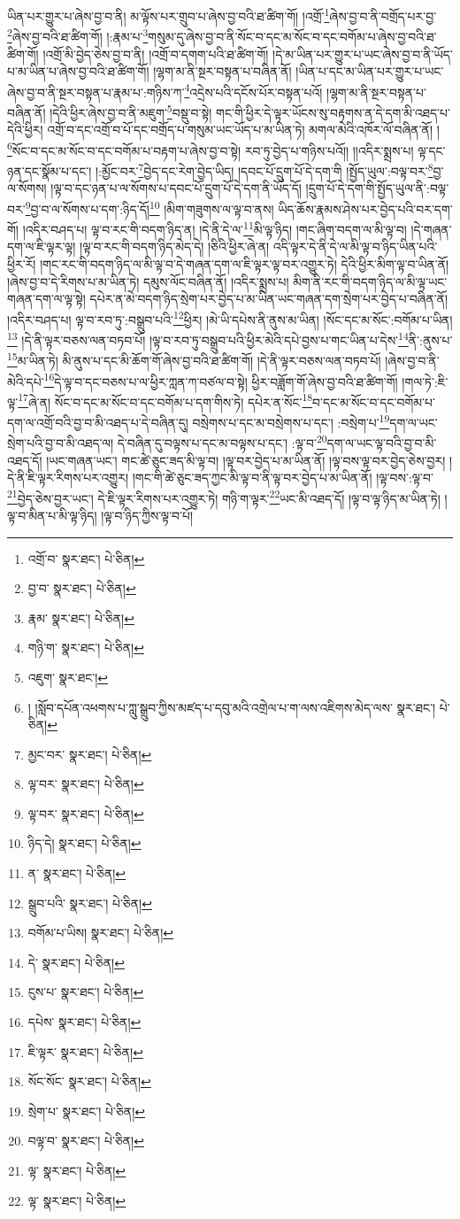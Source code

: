 ཡིན་པར་གྱུར་པ་ཞེས་བྱ་བ་ནི། མ་ལྟོས་པར་གྲུབ་པ་ཞེས་བྱ་བའི་ཐ་ཚིག་གོ། །འགྲོ་\footnote{འགྲོ་བ་  སྣར་ཐང་།  པེ་ཅིན། }ཞེས་བྱ་བ་ནི་བགྲོད་པར་བྱ་\footnote{བྱ་བ་  སྣར་ཐང་།  པེ་ཅིན། }ཞེས་བྱ་བའི་ཐ་ཚིག་གོ། །:རྣམ་པ་\footnote{རྣམ་  སྣར་ཐང་།  པེ་ཅིན། }གསུམ་དུ་ཞེས་བྱ་བ་ནི་སོང་བ་དང་མ་སོང་བ་དང་བགོམ་པ་ཞེས་བྱ་བའི་ཐ་ཚིག་གོ། །འགྲོ་མི་བྱེད་ཅེས་བྱ་བ་ནི། །འགྲོ་བ་དགག་པའི་ཐ་ཚིག་གོ། །དེ་མ་ཡིན་པར་གྱུར་པ་ཡང་ཞེས་བྱ་བ་ནི་ཡོད་པ་མ་ཡིན་པ་ཞེས་བྱ་བའི་ཐ་ཚིག་གོ། །ལྷག་མ་ནི་སྔར་བསྟན་པ་བཞིན་ནོ། །ཡིན་པ་དང་མ་ཡིན་པར་གྱུར་པ་ཡང་ཞེས་བྱ་བ་ནི་སྔར་བསྟན་པ་རྣམ་པ་:གཉིས་ཀ་\footnote{གཉི་ག་  སྣར་ཐང་།  པེ་ཅིན། }འདྲེས་པའི་དངོས་པོར་བསྟན་པའོ། །ལྷག་མ་ནི་སྔར་བསྟན་པ་བཞིན་ནོ། །དེའི་ཕྱིར་ཞེས་བྱ་བ་ནི་མཇུག་\footnote{འཇུག་  སྣར་ཐང་། }བསྡུ་བ་སྟེ། གང་གི་ཕྱིར་དེ་ལྟར་ཡོངས་སུ་བརྟགས་ན་དེ་དག་མི་འཐད་པ་དེའི་ཕྱིར། འགྲོ་བ་དང་འགྲོ་བ་པོ་དང་བགྲོད་པ་གསུམ་ཡང་ཡོད་པ་མ་ཡིན་ཏེ། མགལ་མེའི་འཁོར་ལོ་བཞིན་ནོ། །\footnote{། །སློབ་དཔོན་འཕགས་པ་ཀླུ་སྒྲུབ་ཀྱིས་མཛད་པ་དབུ་མའི་འགྲེལ་པ་ག་ལས་འཇིགས་མེད་ལས་  སྣར་ཐང་།  པེ་ཅིན། }སོང་བ་དང་མ་སོང་བ་དང་བགོམ་པ་བརྟག་པ་ཞེས་བྱ་བ་སྟེ། རབ་ཏུ་བྱེད་པ་གཉིས་པའོ།། །།འདིར་སྨྲས་པ། ལྟ་དང་ཉན་དང་སྣོམ་པ་དང་། །:མྱོང་བར་\footnote{མྱང་བར་  སྣར་ཐང་།  པེ་ཅིན། }བྱེད་དང་རེག་བྱེད་ཡིད། །དབང་པོ་དྲུག་པོ་དེ་དག་གི །སྤྱོད་ཡུལ་:བལྟ་བར་\footnote{ལྟ་བར་  སྣར་ཐང་།  པེ་ཅིན། }བྱ་ལ་སོགས། །ལྟ་བ་དང་ཉན་པ་ལ་སོགས་པ་དབང་པོ་དྲུག་པོ་དེ་དག་ནི་ཡོད་དོ། །དྲུག་པོ་དེ་དག་གི་སྤྱོད་ཡུལ་ནི་:བལྟ་བར་\footnote{ལྟ་བར་  སྣར་ཐང་།  པེ་ཅིན། }བྱ་བ་ལ་སོགས་པ་དག་:ཉིད་དོ།\footnote{ཉིད་དེ།  སྣར་ཐང་།  པེ་ཅིན། } །མིག་གཟུགས་ལ་ལྟ་བ་ནས། ཡིད་ཆོས་རྣམས་ཤེས་པར་བྱེད་པའི་བར་དག་གོ། །འདིར་བཤད་པ། ལྟ་བ་རང་གི་བདག་ཉིད་ན། །དེ་ནི་དེ་ལ་\footnote{ན་  སྣར་ཐང་།  པེ་ཅིན། }མི་ལྟ་ཉིད། །གང་ཞིག་བདག་ལ་མི་ལྟ་བ། །དེ་གཞན་དག་ལ་ཇི་ལྟར་ལྟ། །ལྟ་བ་རང་གི་བདག་ཉིད་མེད་དེ། །ཅིའི་ཕྱིར་ཞེ་ན། འདི་ལྟར་དེ་ནི་དེ་ལ་མི་ལྟ་བ་ཉིད་ཡིན་པའི་ཕྱིར་རོ། །གང་རང་གི་བདག་ཉིད་ལ་མི་ལྟ་བ་དེ་གཞན་དག་ལ་ཇི་ལྟར་ལྟ་བར་འགྱུར་ཏེ། དེའི་ཕྱིར་མིག་ལྟ་བ་ཡིན་ནོ། །ཞེས་བྱ་བ་དེ་རིགས་པ་མ་ཡིན་ཏེ། དམུས་ལོང་བཞིན་ནོ། །འདིར་སྨྲས་པ། མིག་ནི་རང་གི་བདག་ཉིད་ལ་མི་ལྟ་ཡང་གཞན་དག་ལ་ལྟ་སྟེ། དཔེར་ན་མེ་བདག་ཉིད་སྲེག་པར་བྱེད་པ་མ་ཡིན་ཡང་གཞན་དག་སྲེག་པར་བྱེད་པ་བཞིན་ནོ། །འདིར་བཤད་པ། ལྟ་བ་རབ་ཏུ་:བསྒྲུབ་པའི་\footnote{སྒྲུབ་པའི་  སྣར་ཐང་།  པེ་ཅིན། }ཕྱིར། །མེ་ཡི་དཔེས་ནི་ནུས་མ་ཡིན། །སོང་དང་མ་སོང་:བགོམ་པ་ཡིན།\footnote{བགོམ་པ་ཡིས།  སྣར་ཐང་།  པེ་ཅིན། } །དེ་ནི་ལྟར་བཅས་ལན་བཏབ་པོ། །ལྟ་བ་རབ་ཏུ་བསྒྲུབ་པའི་ཕྱིར་མེའི་དཔེ་བྱས་པ་གང་ཡིན་པ་དེས་\footnote{དེ་  སྣར་ཐང་།  པེ་ཅིན། }ནི་:ནུས་པ་\footnote{ངུས་པ་  སྣར་ཐང་།  པེ་ཅིན། }མ་ཡིན་ཏེ། མི་ནུས་པ་དང་མི་ཆོག་གོ་ཞེས་བྱ་བའི་ཐ་ཚིག་གོ། །དེ་ནི་ལྟར་བཅས་ལན་བཏབ་པོ། །ཞེས་བྱ་བ་ནི་མེའི་དཔེ་\footnote{དཔེས་  སྣར་ཐང་།  པེ་ཅིན། }དེ་ལྟ་བ་དང་བཅས་པ་ལ་ཕྱིར་ཀླན་ཀ་བཙལ་བ་སྟེ། ཕྱིར་བཟློག་གོ་ཞེས་བྱ་བའི་ཐ་ཚིག་གོ། །གལ་ཏེ་:ཇི་ལྟ་\footnote{ཇི་ལྟར་  སྣར་ཐང་།  པེ་ཅིན། }ཞེ་ན། སོང་བ་དང་མ་སོང་བ་དང་བགོམ་པ་དག་གིས་ཏེ། དཔེར་ན་སོང་\footnote{སོང་སོང་  སྣར་ཐང་།  པེ་ཅིན། }བ་དང་མ་སོང་བ་དང་བགོམ་པ་དག་ལ་འགྲོ་བའི་བྱ་བ་མི་འཐད་པ་དེ་བཞིན་དུ། བསྲེགས་པ་དང་མ་བསྲེགས་པ་དང་། :བསྲེག་པ་\footnote{སྲེག་པ་  སྣར་ཐང་།  པེ་ཅིན། }དག་ལ་ཡང་སྲེག་པའི་བྱ་བ་མི་འཐད་ལ། དེ་བཞིན་དུ་བལྟས་པ་དང་མ་བལྟས་པ་དང་། :ལྟ་བ་\footnote{བལྟ་བ་  སྣར་ཐང་།  པེ་ཅིན། }དག་ལ་ཡང་ལྟ་བའི་བྱ་བ་མི་འཐད་དོ། །ཡང་གཞན་ཡང་། གང་ཚེ་ཅུང་ཟད་མི་ལྟ་བ། །ལྟ་བར་བྱེད་པ་མ་ཡིན་ནོ། །ལྟ་བས་ལྟ་བར་བྱེད་ཅེས་བྱར། །དེ་ནི་ཇི་ལྟར་རིགས་པར་འགྱུར། །གང་གི་ཚེ་ཅུང་ཟད་ཀྱང་མི་ལྟ་བ་ནི་ལྟ་བར་བྱེད་པ་མ་ཡིན་ནོ། །ལྟ་བས་:ལྟ་བ་\footnote{ལྟ་  སྣར་ཐང་།  པེ་ཅིན། }བྱེད་ཅེས་བྱར་ཡང་། དེ་ཇི་ལྟར་རིགས་པར་འགྱུར་ཏེ། གཉི་ག་ལྟར་\footnote{ལྟ་  སྣར་ཐང་།  པེ་ཅིན། }ཡང་མི་འཐད་དོ། །ལྟ་བ་ལྟ་ཉིད་མ་ཡིན་ཏེ། །ལྟ་བ་མིན་པ་མི་ལྟ་ཉིད། །ལྟ་བ་ཉིད་ཀྱིས་ལྟ་བ་པོ། 
